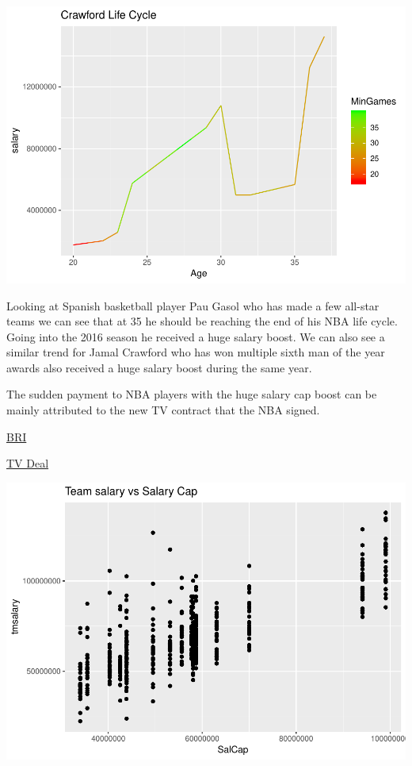 \documentclass[]{article}
\begin{document}
\includegraphics{nba_salary_final_report_files/figure-latex/unnamed-chunk-5-1.pdf}

Looking at Spanish basketball player Pau Gasol who has made a few
all-star teams we can see that at 35 he should be reaching the end of
his NBA life cycle. Going into the 2016 season he received a huge salary
boost. We can also see a similar trend for Jamal Crawford who has won
multiple sixth man of the year awards also received a huge salary boost
during the same year.

The sudden payment to NBA players with the huge salary cap boost can be
mainly attributed to the new TV contract that the NBA signed.

\href{https://www.investopedia.com/articles/investing/070715/nbas-business-model.asp}{BRI}

\href{http://www.nba.com/article/2017/04/05/nba-tv-ratings-promising-first-year-new-deal}{TV
Deal}

\includegraphics{nba_salary_final_report_files/figure-latex/unnamed-chunk-6-1.pdf}
\end{document}
